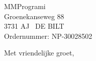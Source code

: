 \documentclass[]{scrlttr2}
\begin{document}
  \begin{letter}{
    MMProgrami\\
    Groenekanseweg 88\\
    3731 AJ \ DE BILT\\
    Ordernummer: NP-30028502
  }
    \opening{}
    
		\closing{Met vriendelijke groet,}
  \end{letter}
\end{document}
